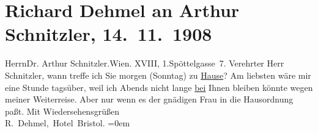

         
         \renewcommand{\erwaehntePersonen}{Personen: Olga Schnitzler}
         \renewcommand{\erwaehnteOrte}{Orte: Edmund-Weiß-Gasse, Hotel Bristol, I., Innere Stadt, Wien, XVIII., Währing}
         \renewcommand{\erwaehnteWerke}{}
               \section[Richard Dehmel an Arthur Schnitzler, 14. 11. 1908]{ Richard Dehmel an Arthur Schnitzler, 14. 11. 1908}\nopagebreak{}\rehead{ }\begin{ledgroupsized}[t]{13cm}\normalsize\beginnumbering \toendnotes[C]{\smallbreak\pagebreak[2]} 
\pstart{}{\pb}Herrn\pend{}\pstart{}Dr. Arthur Schnitzler.\pend{}\pstart{}Wien. XVIII, 1.\pend{}\pstart{}Spöttelgasse 7.\pend{}{\bigskip}\pstart
           \noindent{}{\pb}Verehrter Herr Schnitzler,
               wann treffe ich Sie morgen (Sonntag) zu \uline{Hause}? Am liebsten wäre mir eine Stunde tagsüber, weil ich Abends  nicht lange \uline{bei} Ihnen bleiben könnte wegen meiner Weiterreise. Aber nur wenn es der
               gnädigen Frau in die Hausordnung paßt.\pend
           \pstart
           Mit Wiedersehensgrüßen{\\[\baselineskip]}\spacefill\mbox{R. Dehmel, Hotel
                  Bristol}.\pend
           \leftskip=0em{}
         
         \endnumbering{}\end{ledgroupsized}  \newcommand{\dateiname}{L01801}\newcommand{\titel}{Richard Dehmel an Arthur Schnitzler, 14. 11. 1908}\newcommand{\editorInnen}{Martin Anton Müller und Gerd-Hermann Susen}
      